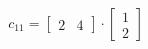 \documentclass[preview]{standalone}
\begin{document}
\begin{align*}
c_{11} = \begin{bmatrix} 2 & 4 \end{bmatrix} \cdot \begin{bmatrix} 1 \\ 2 \end{bmatrix}
\end{align*}
\end{document}
